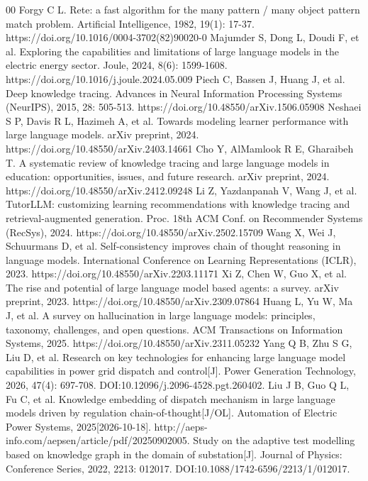 \documentclass[conference]{IEEEtran}
\begin{document}
\begin{thebibliography}{00}
 Forgy C L. Rete: a fast algorithm for the many pattern / many object pattern match problem. Artificial Intelligence, 1982, 19(1): 17-37. https://doi.org/10.1016/0004-3702(82)90020-0
 Majumder S, Dong L, Doudi F, et al. Exploring the capabilities and limitations of large language models in the electric energy sector. Joule, 2024, 8(6): 1599-1608. https://doi.org/10.1016/j.joule.2024.05.009
 Piech C, Bassen J, Huang J, et al. Deep knowledge tracing. Advances in Neural Information Processing Systems (NeurIPS), 2015, 28: 505-513. https://doi.org/10.48550/arXiv.1506.05908
 Neshaei S P, Davis R L, Hazimeh A, et al. Towards modeling learner performance with large language models. arXiv preprint, 2024. https://doi.org/10.48550/arXiv.2403.14661
 Cho Y, AlMamlook R E, Gharaibeh T. A systematic review of knowledge tracing and large language models in education: opportunities, issues, and future research. arXiv preprint, 2024. https://doi.org/10.48550/arXiv.2412.09248
 Li Z, Yazdanpanah V, Wang J, et al. TutorLLM: customizing learning recommendations with knowledge tracing and retrieval-augmented generation. Proc. 18th ACM Conf. on Recommender Systems (RecSys), 2024. https://doi.org/10.48550/arXiv.2502.15709
 Wang X, Wei J, Schuurmans D, et al. Self-consistency improves chain of thought reasoning in language models. International Conference on Learning Representations (ICLR), 2023. https://doi.org/10.48550/arXiv.2203.11171
 Xi Z, Chen W, Guo X, et al. The rise and potential of large language model based agents: a survey. arXiv preprint, 2023. https://doi.org/10.48550/arXiv.2309.07864
 Huang L, Yu W, Ma J, et al. A survey on hallucination in large language models: principles, taxonomy, challenges, and open questions. ACM Transactions on Information Systems, 2025. https://doi.org/10.48550/arXiv.2311.05232
 Yang Q B, Zhu S G, Liu D, et al. Research on key technologies for enhancing large language model capabilities in power grid dispatch and control[J]. Power Generation Technology, 2026, 47(4): 697-708. DOI:10.12096/j.2096-4528.pgt.260402.
 Liu J B, Guo Q L, Fu C, et al. Knowledge embedding of dispatch mechanism in large language models driven by regulation chain-of-thought[J/OL]. Automation of Electric Power Systems, 2025[2026-10-18]. http://aeps-info.com/aepsen/article/pdf/20250902005.
 Study on the adaptive test modelling based on knowledge graph in the domain of substation[J]. Journal of Physics: Conference Series, 2022, 2213: 012017. DOI:10.1088/1742-6596/2213/1/012017.
\end{thebibliography}
\end{document}
